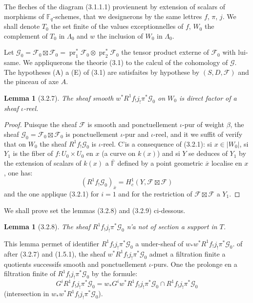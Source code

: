 \documentclass[12pt,a4paper]{article}
\theoremstyle{plain}
\newtheorem{lemma}[theorem]{Lemma}
\theoremstyle{definition}
\theoremstyle{remark}
\DeclareMathOperator{\pr}{pr}
\newcommand{\FF}{{\mathbb{F}}}
\begin{document}
The fleches of the diagram (3.1.1.1) proviennent by extension of scalars of morphisms of $\FF_q$-schemes, that we designerons by the same lettres $f$, $\pi$, $j$. We shall denote $T_0$ the set finite of the values exceptionnelles of $f$, $W_0$ the complement of $T_0$ in $\Lambda_0$ and $w$ the inclusion of $W_0$ in $\Lambda_0$.

Let $\mathscr{G}_0 = \mathscr{F}_0 \boxtimes \mathscr{F}_0 = \pr_1^*\mathscr{F}_0 \otimes \pr_2^*\mathscr{F}_0$ the tensor product externe of $\mathscr{F}_0$ with lui-same. We appliquerons the theorie (3.1) to the calcul of the cohomology of $\mathscr{G}$. The hypotheses (A) a (E) of (3.1) are satisfaites by hypothese by $(S, D, \mathscr{F})$ and the pinceau of axe $A$.


\begin{lemma}[3.2.7]
The sheaf smooth $w^* R^1 f_! j_! \pi^* \mathscr{G}_0$ on $W_0$ is direct factor of a sheaf $\iota$-reel.
\end{lemma}

\begin{proof}
Puisque the sheaf $\mathscr{F}$ is smooth and ponctuellement $\iota$-pur of weight $\beta$, the sheaf $\mathscr{G}_0 = \mathscr{F}_0 \boxtimes \mathscr{F}_0$ is ponctuellement $\iota$-pur and $\iota$-reel, and it we suffit of verify that on $W_0$ the sheaf $R^1 f_! \mathscr{G}_0$ is $\iota$-reel. C'is a consequence of (3.2.1): si $x \in |W_0|$, si $Y_1$ is the fiber of $f : U_0 \times U_0$ en $x$ (a curve on $k(x)$) and si $Y$ se deduces of $Y_1$ by the extension of scalars of $k(x)$ a $\overline{\FF}$ defined by a point geometric $\overline{x}$ localise en $x$, one has:
\begin{equation}\label{eq:3.2.7.1}
(R^1 f_! \mathscr{G}_0)_{\overline{x}} = H_c^1(Y, \mathscr{F} \boxtimes \mathscr{F})
\end{equation}
and the one applique (3.2.1) for $i = 1$ and for the restriction of $\mathscr{F} \boxtimes \mathscr{F}$ a $Y_1$.
\end{proof}

We shall prove set the lemmas (3.2.8) and (3.2.9) ci-dessous.

\begin{lemma}[3.2.8]
The sheaf $R^1 f_! j_! \pi^* \mathscr{G}_0$ n'a not of section a support in $T$.
\end{lemma}

This lemma permet of identifier $R^1 f_! j_! \pi^* \mathscr{G}_0$ a under-sheaf of $w_* w^* R^1 f_! j_! \pi^* \mathscr{G}_0$. of after (3.2.7) and (1.5.1), the sheaf $w^* R^1 f_! j_! \pi^* \mathscr{G}_0$ admet a filtration finite a quotients successifs smooth and ponctuellement $\iota$-purs. One the prolonge en a filtration finite of $R^1 f_! j_! \pi^* \mathscr{G}_0$ by the formule:
\[ G^i R^1 f_! j_! \pi^* \mathscr{G}_0 = w_* G^i w^* R^1 f_! j_! \pi^* \mathscr{G}_0 \cap R^1 f_! j_! \pi^* \mathscr{G}_0 \]
(intersection in $w_* w^* R^1 f_! j_! \pi^* \mathscr{G}_0$).
\end{document}
